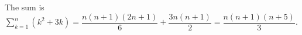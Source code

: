 The sum is $\sum_{k=1}^n(k^2+3k)=\dfrac{n(n+1)(2n+1)}{6}+\dfrac{3n(n+1)}{2}=\boxed{\dfrac{n(n+1)(n+5)}{3}}$.
